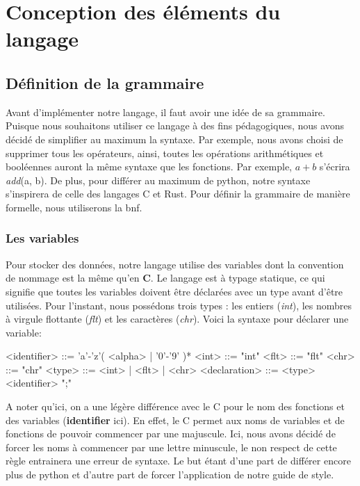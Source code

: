 \documentclass[a4paper]{article}%
\begin{document}
\section{Conception des éléments du langage}

\subsection{Définition de la grammaire}

Avant d'implémenter notre langage, il faut avoir une idée de sa grammaire.
Puisque nous souhaitons utiliser ce langage à des fins pédagogiques, nous avons
décidé de simplifier au maximum la syntaxe. Par exemple, nous avons choisi de
supprimer tous les opérateurs, ainsi, toutes les opérations arithmétiques et
booléennes auront la même syntaxe que les fonctions. Par exemple, $a+b$ s'écrira
\textit{add}(a, b). De plus, pour différer au maximum de python, notre syntaxe
s'inspirera de celle des langages C et Rust. Pour définir la grammaire de
manière formelle, nous utiliserons la \gls{bnf}.

\subsubsection*{Les variables}

Pour stocker des données, notre langage utilise des variables dont la
convention de nommage est la même qu'en \textbf{C}. Le langage est à typage
statique, ce qui signifie que toutes les variables doivent être déclarées avec
un type avant d'être utilisées. Pour l'instant, nous possédons trois types :
les entiers (\textit{int}), les nombres à virgule flottante (\textit{flt}) et les
caractères (\textit{chr}). Voici la syntaxe pour déclarer une variable:

\begin{grammar}
<identifier> ::= 'a'-'z'( <alpha> | '0'-'9' )*
<int> ::= "int"
<flt> ::= "flt"
<chr> ::= "chr"
<type> ::= <int> | <flt> | <chr>
<declaration> ::= <type> <identifier> ";"
\end{grammar}\leavevmode\newline

A noter qu'ici, on a une légère différence avec le C pour le nom des fonctions
et des variables (\textbf{identifier} ici). En effet, le C permet aux noms de
variables et de fonctions de pouvoir commencer par une majuscule. Ici, nous
avons décidé de forcer les noms à commencer par une lettre minuscule, le non
respect de cette règle entrainera une erreur de syntaxe. Le but étant d'une part
de différer encore plus de python et d'autre part de forcer l'application de
notre guide de style.
\end{document}
